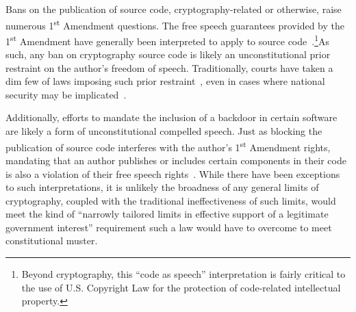 Bans on the publication of source code, cryptography-related or
otherwise, raise numerous 1\textsuperscript{st} Amendment
questions. The free speech guarantees provided by the
1\textsuperscript{st} Amendment have generally been interpreted to
apply to source code~\cite{ninthcir-bernstein,
  sixthcir-junger}.\footnote{Beyond cryptography, this ``code as
  speech'' interpretation is fairly critical to the use of
  U.S. Copyright Law for the protection of code-related intellectual
  property.}As such, any ban on cryptography source code is likely an
unconstitutional prior restraint on the author's freedom of
speech. Traditionally, courts have taken a dim few of laws imposing
such prior restraint~\cite{scotus-nearvminnesota}, even in cases where
national security may be implicated~\cite{scotus-nytvus}.

Additionally, efforts to mandate the inclusion of a backdoor in
certain software are likely a form of unconstitutional compelled
speech. Just as blocking the publication of source code interferes
with the author's 1\textsuperscript{st} Amendment rights, mandating
that an author publishes or includes certain components in their code
is also a violation of their free speech
rights~\cite{scotus-wooleyvmaynard}. While there have been exceptions
to such interpretations, it is unlikely the broadness of any general
limits of cryptography, coupled with the traditional ineffectiveness
of such limits, would meet the kind of ``narrowly tailored limits in
effective support of a legitimate government interest'' requirement
such a law would have to overcome to meet constitutional muster.


